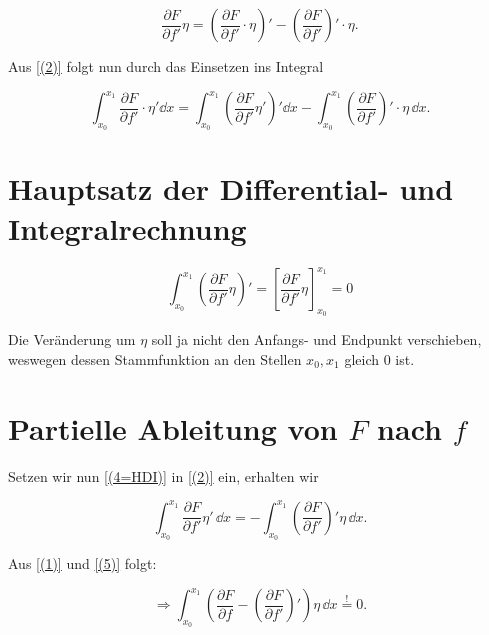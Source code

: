 \begin{equation}\label{(2)}
 \frac{\partial F}{\partial f'} \eta 
 = \left(\frac{\partial F}{\partial f'} \cdot \eta\right)'
 - \left(\frac{\partial F}{\partial f'}\right)' \cdot \eta.
\end{equation}

Aus \ref{(2)} folgt nun durch das Einsetzen ins Integral

\begin{equation}\label{(3)}
 \int_{x_0}^{x_1} \frac{\partial F}{\partial f'} \cdot \eta'\dd x 
 = \int_{x_0}^{x_1} \left(\frac{\partial F}{\partial f'}\eta'\right)'\dd x 
 - \int_{x_0}^{x_1} \left(\frac{\partial F}{\partial f'}\right)' \cdot \eta \,\dd x.
\end{equation}

\section{Hauptsatz der Differential- und Integralrechnung}


\begin{equation}\label{(4=HDI)}
 \int_{x_0}^{x_1} \left(\frac{\partial F}{\partial f'} \eta \right)'
 = \left[\frac{\partial F}{\partial f'}\eta\right]_{x_0}^{x_1}=0
\end{equation}

Die Veränderung um $\eta$ soll ja nicht den Anfangs- und Endpunkt verschieben, weswegen dessen Stammfunktion an den Stellen $x_0, x_1$ gleich $0$ ist.

\section{Partielle Ableitung von $F$ nach $f$}

Setzen wir nun \ref{(4=HDI)} in \ref{(2)} ein, erhalten wir

\begin{equation}\label{(5)}
 \int_{x_0}^{x_1} \frac{\partial F}{\partial f'} \eta' \,\dd x 
 = - \int_{x_0}^{x_1} \left(\frac{\partial F}{\partial f'} \right)' \eta \,\dd x.
\end{equation}

Aus \ref{(1)} und \ref{(5)} folgt:

\begin{equation}\label{(6vor)}
 \Rightarrow \int_{x_0}^{x_1} \left(\frac{\partial F}{\partial f}- \left(\frac{\partial F}{\partial f'}\right)'\right) \eta \,\dd x \overset{!}{=} 0.
\end{equation}

